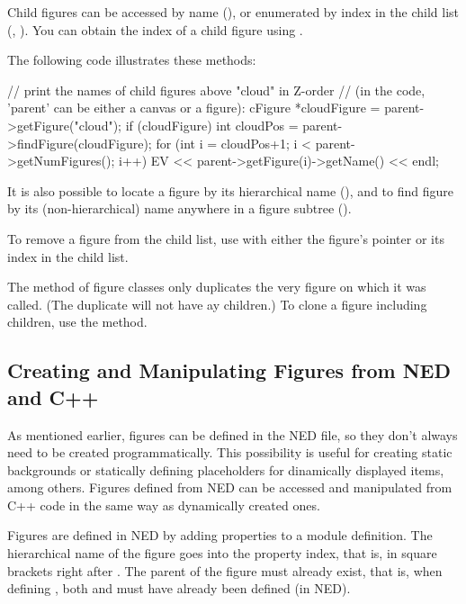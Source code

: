 Child figures can be accessed by name (), or
enumerated by index in the child list (,
). You can obtain the index of a child figure using
.

The following code illustrates these methods:

\begin{cpp}
// print the names of child figures above "cloud" in Z-order
// (in the code, 'parent' can be either a canvas or a figure):
cFigure *cloudFigure = parent->getFigure("cloud");
if (cloudFigure) {
    int cloudPos = parent->findFigure(cloudFigure);
    for (int i = cloudPos+1; i < parent->getNumFigures(); i++)
        EV << parent->getFigure(i)->getName() << endl;
}
\end{cpp}

It is also possible to locate a figure by its hierarchical name
(), and to find figure by its (non-hierarchical)
name anywhere in a figure subtree ().

To remove a figure from the child list, use  with
either the figure's pointer or its index in the child list.

The  method of figure classes only duplicates the very figure
on which it was called. (The duplicate will not have ay children.) To clone
a figure including children, use the  method.


\subsection{Creating and Manipulating Figures from NED and C++}

As mentioned earlier, figures can be defined in the NED file, so they
don't always need to be created programmatically. This possibility is
useful for creating static backgrounds or statically defining placeholders
for dinamically displayed items, among others. Figures defined from NED can
be accessed and manipulated from C++ code in the same way as dynamically
created ones.

Figures are defined in NED by adding  properties to a module definition.
The hierarchical name of the figure goes into the property index, that is, in
square brackets right after . The parent of the figure must
already exist, that is, when defining , both  and
 must have already been defined (in NED).

